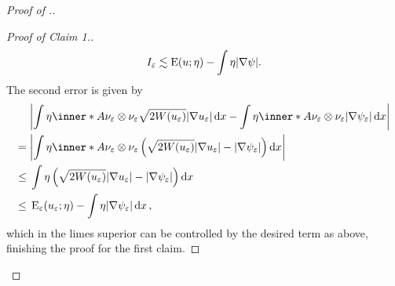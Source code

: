 \begin{proof}[Proof of .]
\begin{proof}[Proof of Claim 1.]
\begin{equation*}
			I_{ \varepsilon }
			\lesssim
			\operatorname{E} ( u ; \eta )
			-
			\int
			\eta
			\abs{ \nabla \psi }.
		\end{equation*}
		The second error is given by
		\begin{align*}
			& \abs{
				\int
				\eta
				\inner*{ A }{ \nu_{ \varepsilon } \otimes \nu_{ \varepsilon 
				} }
				\sqrt{ 2 W ( u_{ \varepsilon } ) }
				\abs{ \nabla u_{ \varepsilon } }
				\dd{ x }
				-
				\int
				\eta
				\inner*{ A }{ \nu_{ \varepsilon } \otimes \nu_{ \varepsilon 
				} }
				\abs{ \nabla \psi_{ \varepsilon } }
				\dd{ x }
			}
			\\
			={} &
			\abs{
				\int
				\eta
				\inner*{ A }{ \nu_{ \varepsilon } \otimes \nu_{ \varepsilon 
				} }
				\left(
				\sqrt{ 2 W ( u_{ \varepsilon } ) } \abs{ \nabla u_{ 
						\varepsilon } } 
				-
				\abs{ \nabla \psi_{ \varepsilon } }
				\right)
				\dd{ x }
			}
			\\
			\leq {} &
			\int
			\eta
			\left(
			\sqrt{ 2 W ( u_{ \varepsilon } ) }
			\abs{ \nabla u_{ \varepsilon } }
			-
			\abs{ \nabla \psi_{ \varepsilon } }
			\right)
			\dd{ x }
			\\
			\leq{} &
			\energy_{ \varepsilon } ( u_{ \varepsilon } ; \eta )
			-
			\int
			\eta 
			\abs{ \nabla \psi_{ \varepsilon } }
			\dd{ x },
		\end{align*}
		which in the limes superior can be controlled by the desired term as 
		above, finishing the proof for the first claim.
	\end{proof}
	

\end{proof}
